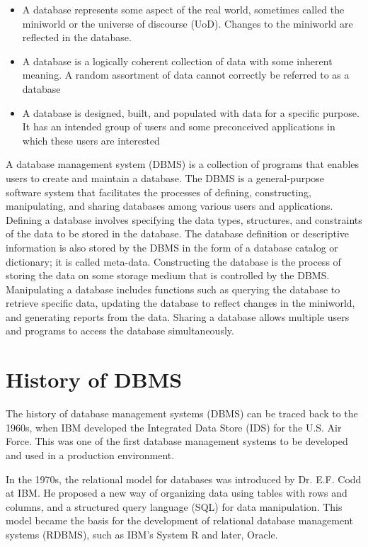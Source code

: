 \begin{itemize}
\item{A database represents some aspect of the real world, sometimes called the miniworld or the universe of discourse (UoD). Changes to the miniworld are reflected in the database.}
\item{A database is a logically coherent collection of data with some inherent meaning. A random assortment of data cannot correctly be referred to as a database}
\item{A database is designed, built, and populated with data for a specific purpose. It has an intended group of users and some preconceived applications in which these users are interested}
\end{itemize}
A database management system (DBMS) is a collection of programs that enables users to create and maintain a database. The DBMS is a general-purpose software system that facilitates the processes of defining, constructing, manipulating, and sharing databases among various users and applications. Defining a database involves specifying the data types, structures, and constraints of the data to be stored in the database. The database definition or descriptive information is also stored by the DBMS in the form of a database catalog or dictionary; it is called meta-data. Constructing the database is the process of storing the data on some storage medium that is controlled by the DBMS. Manipulating a database includes functions such as querying the database to retrieve specific data, updating the database to reflect changes in the miniworld, and generating reports from the data. Sharing a database allows multiple users and programs to access the database simultaneously.

\thispagestyle{fancy}


\section{ History of DBMS}
The history of database management systems (DBMS) can be traced back to the 1960s, when IBM developed the Integrated Data Store (IDS) for the U.S. Air Force. This was one of the first database management systems to be developed and used in a production environment.

In the 1970s, the relational model for databases was introduced by Dr. E.F. Codd at IBM. He proposed a new way of organizing data using tables with rows and columns, and a structured query language (SQL) for data manipulation. This model became the basis for the development of relational database management systems (RDBMS), such as IBM's System R and later, Oracle.

